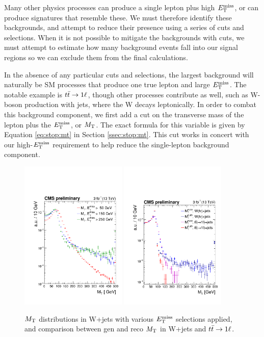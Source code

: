 Many other physics processes can produce a single lepton plus high
$E_\text{T}^\text{miss}$, or can produce signatures that resemble these. We must therefore
identify these backgrounds, and attempt to reduce their presence using
a series of cuts and selections. When it is not possible to mitigate
the backgrounds with cuts, we must attempt to estimate how many
background events fall into our signal regions so we can exclude them
from the final calculations.

In the absence of any particular cuts and selections, the largest
background will naturally be SM processes that produce one true lepton
and large $E_\text{T}^\text{miss}$. The notable example is $t\bar{t} \rightarrow 1\ell$,
though other processes contribute as well, such as W-boson production
with jets, where the W decays leptonically. In order to combat this
background component, we first add a cut on the transverse mass of the
lepton plus the $E_\text{T}^\text{miss}$, or $M_\text{T}$. The exact formula for this variable is
given by Equation \ref{eq:stop:mt} in Section \ref{ssec:stop:mt}. This cut works in
concert with our high-$E_\text{T}^\text{miss}$ requirement to help reduce the single-lepton
background component.

\begin{figure}[htb]
\centering
\includegraphics[width=0.45\textwidth]{figures/mtstudies_W_reco.pdf}
\includegraphics[width=0.45\textwidth]{figures/mtstudies_WTop_recogen.pdf}
\caption{$M_\text{T}$ distributions in W+jets with various $E_\text{T}^\text{miss}$ selections
  applied, and comparison between gen and reco $M_\text{T}$ in W+jets and
  $t\bar{t} \rightarrow 1\ell$.}
\label{fig:stop:mtstudies}
\end{figure}

